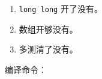 \begin{enumerate}
    \item \verb|long long| 开了没有。
    \item 数组开够没有。
    \item 多测清了没有。
\end{enumerate}
编译命令：
\inputminted{bash}{src/tools/compile.sh}